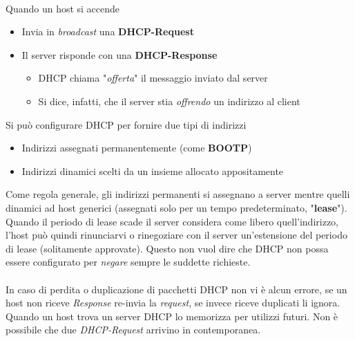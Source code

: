 \documentclass{article}
\begin{document}
            \\
            Quando un host si accende
            \begin{itemize}
                \item Invia in \textit{broadcast} una \textbf{DHCP-Request}
                \item Il server risponde con una \textbf{DHCP-Response}
                      \begin{itemize}
                          \item DHCP chiama "\textit{offerta}" il messaggio inviato dal server
                          \item Si dice, infatti, che il server stia \textit{offrendo} un indirizzo al client
                      \end{itemize}
            \end{itemize}
            Si può configurare DHCP per fornire due tipi di indirizzi
            \begin{itemize}
                \item Indirizzi assegnati permanentemente (come \textbf{BOOTP})
                \item Indirizzi dinamici scelti da un insieme allocato appositamente
            \end{itemize}
            Come regola generale, gli indirizzi permanenti si assegnano a server mentre quelli dinamici ad host generici (assegnati solo per un tempo predeterminato, "\textbf{lease}").\\
            Quando il periodo di lease scade il server considera come libero quell'indirizzo, l'host può quindi rinunciarvi o rinegoziare con il server un'estensione del periodo di lease (solitamente approvate). Questo non vuol dire che DHCP non possa essere configurato per \textit{negare} sempre le suddette richieste.\\
            \\
            In caso di perdita o duplicazione di pacchetti DHCP non vi è alcun errore, se un host non riceve \textit{Response} re-invia la \textit{request}, se invece riceve duplicati li ignora.\\
            Quando un host trova un server DHCP lo memorizza per utilizzi futuri. Non è possibile che due \textit{DHCP-Request} arrivino in contemporanea.
            
\end{document}
